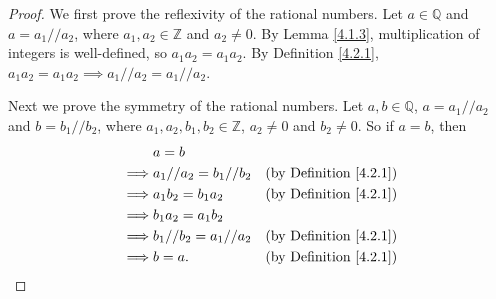 \begin{proof}
We first prove the reflexivity of the rational numbers.
Let \(a \in \mathds{Q}\) and \(a = a_1 // a_2\), where \(a_1, a_2 \in \mathds{Z}\) and \(a_2 \neq 0\).
By Lemma \ref{4.1.3}, multiplication of integers is well-defined, so \(a_1a_2 = a_1a_2\).
By Definition \ref{4.2.1}, \(a_1a_2 = a_1a_2 \implies a_1 // a_2 = a_1 // a_2\).

Next we prove the symmetry of the rational numbers.
Let \(a, b \in \mathds{Q}\), \(a = a_1 // a_2\) and \(b = b_1 // b_2\), where \(a_1, a_2, b_1, b_2 \in \mathds{Z}\), \(a_2 \neq 0\) and \(b_2 \neq 0\).
So if \(a = b\), then
\begin{align*}
& a = b \\
\implies & a_1 // a_2 = b_1 // b_2 & \text{(by Definition \ref{4.2.1})} \\
\implies & a_1b_2 = b_1a_2 & \text{(by Definition \ref{4.2.1})} \\
\implies & b_1a_2 = a_1b_2 \\
\implies & b_1 // b_2 = a_1 // a_2 & \text{(by Definition \ref{4.2.1})} \\
\implies & b = a. & \text{(by Definition \ref{4.2.1})}
\end{align*}


\end{proof}
